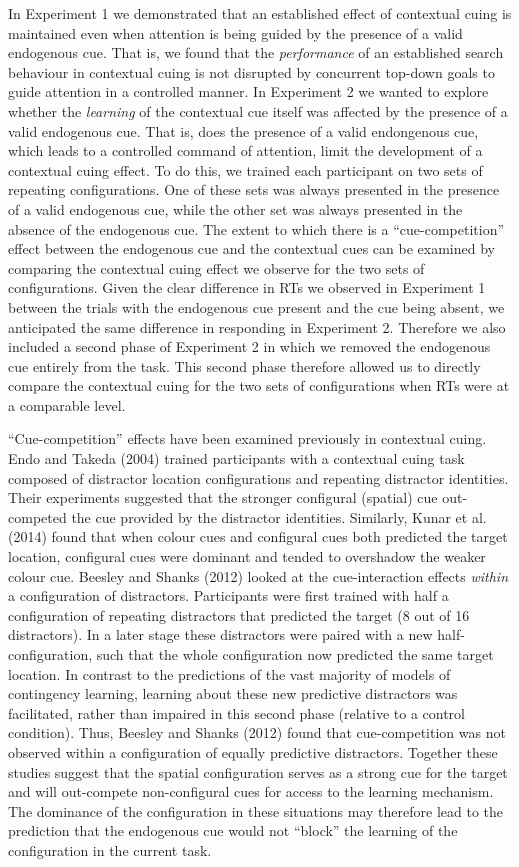 \documentclass[
  man,floatsintext]{apa7}
\begin{document}
In Experiment 1 we demonstrated that an established effect of contextual cuing is maintained even when attention is being guided by the presence of a valid endogenous cue. That is, we found that the \emph{performance} of an established search behaviour in contextual cuing is not disrupted by concurrent top-down goals to guide attention in a controlled manner. In Experiment 2 we wanted to explore whether the \emph{learning} of the contextual cue itself was affected by the presence of a valid endogenous cue. That is, does the presence of a valid endongenous cue, which leads to a controlled command of attention, limit the development of a contextual cuing effect. To do this, we trained each participant on two sets of repeating configurations. One of these sets was always presented in the presence of a valid endogenous cue, while the other set was always presented in the absence of the endogenous cue. The extent to which there is a ``cue-competition'' effect between the endogenous cue and the contextual cues can be examined by comparing the contextual cuing effect we observe for the two sets of configurations. Given the clear difference in RTs we observed in Experiment 1 between the trials with the endogenous cue present and the cue being absent, we anticipated the same difference in responding in Experiment 2. Therefore we also included a second phase of Experiment 2 in which we removed the endogenous cue entirely from the task. This second phase therefore allowed us to directly compare the contextual cuing for the two sets of configurations when RTs were at a comparable level.

``Cue-competition'' effects have been examined previously in contextual cuing. Endo and Takeda (2004) trained participants with a contextual cuing task composed of distractor location configurations and repeating distractor identities. Their experiments suggested that the stronger configural (spatial) cue out-competed the cue provided by the distractor identities. Similarly, Kunar et al. (2014) found that when colour cues and configural cues both predicted the target location, configural cues were dominant and tended to overshadow the weaker colour cue. Beesley and Shanks (2012) looked at the cue-interaction effects \emph{within} a configuration of distractors. Participants were first trained with half a configuration of repeating distractors that predicted the target (8 out of 16 distractors). In a later stage these distractors were paired with a new half-configuration, such that the whole configuration now predicted the same target location. In contrast to the predictions of the vast majority of models of contingency learning, learning about these new predictive distractors was facilitated, rather than impaired in this second phase (relative to a control condition). Thus, Beesley and Shanks (2012) found that cue-competition was not observed within a configuration of equally predictive distractors. Together these studies suggest that the spatial configuration serves as a strong cue for the target and will out-compete non-configural cues for access to the learning mechanism. The dominance of the configuration in these situations may therefore lead to the prediction that the endogenous cue would not ``block'' the learning of the configuration in the current task.
\end{document}
